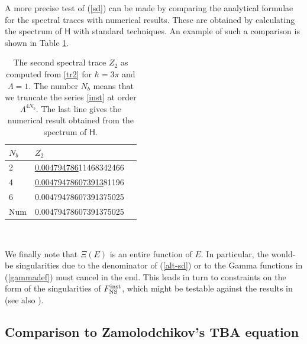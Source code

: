 \documentclass[a4paper,11pt]{article}
\theoremstyle{definition}
\newcommand{\mH}{\mathsf{H}}
\begin{document}
A more precise test of (\ref{sd}) can be made by comparing the analytical formulae for the spectral traces with numerical results. These are obtained 
by calculating the spectrum of $\mH$ with standard techniques. An example of such a comparison is shown in Table \ref{tbx1}. 
\begin{table}[h!] 
\centering
   \begin{tabular}{l l l}
  \\
 $N_b$& $Z_2$  \\
\hline
2 &  \underline{0.004794786}11468342466\\
 4 & \underline{0.004794786073913}81196\\ 
 6 &                 0.00479478607391375025           \\  
 \hline
Num &  0.00479478607391375025    \\
\end{tabular}    \\
\caption{ The second spectral trace $Z_2$ as computed from  \eqref{tr2} for $\hbar=3\pi$ and $\Lambda=1$. The number $N_b$ means that we truncate the series \eqref{inst}  at order $\Lambda^{4 N_b}$. The last line gives the numerical result obtained from the spectrum of $\mH$. }
   \label{tbx1}
 \end{table}

We finally note that $\Xi(E)$ is an entire function of $E$. In particular, the would-be singularities due to the denominator of (\ref{alt-sd}) or to 
the Gamma functions in (\ref{gammadef}) must cancel in the end. This leads in turn to constraints on the form of the singularities of $F_{\rm NS}^{\rm inst}$, 
which might be testable against the results in \cite{gorsky-bands} (see also \cite{beccaria}). 

\subsection{Comparison to Zamolodchikov's TBA equation}
\end{document}
